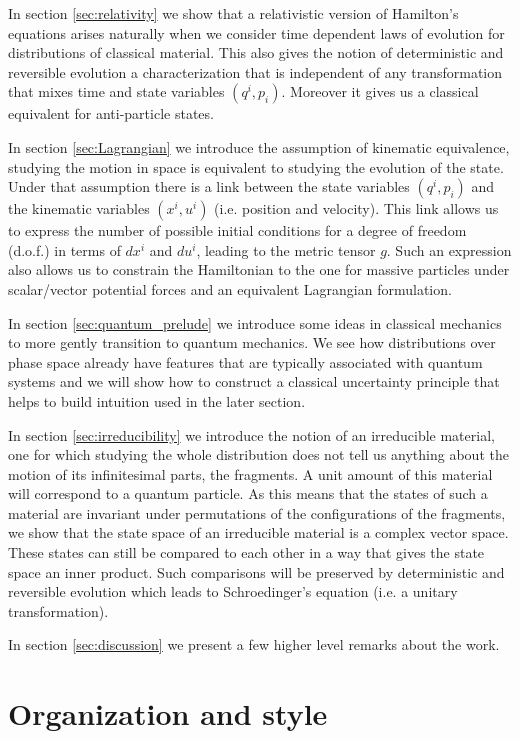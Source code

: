 \documentclass[smallextended]{svjour3}
\numberwithin{equation}{section}
\theoremstyle{definition}
\begin{document}
In section \ref{sec:relativity} we show that a relativistic version of Hamilton's equations arises naturally when we consider time dependent laws of evolution for distributions of classical material. This also gives the notion of deterministic and reversible evolution a characterization that is independent of any transformation that mixes time and state variables $(q^i, p_i)$. Moreover it gives us a classical equivalent for anti-particle states.

In section \ref{sec:Lagrangian} we introduce the assumption of kinematic equivalence, studying the motion in space is equivalent to studying the evolution of the state. Under that assumption there is a link between the state variables $(q^i, p_i)$ and the kinematic variables $(x^i, u^i)$ (i.e. position and velocity). This link allows us to express the number of possible initial conditions for a degree of freedom (d.o.f.) in terms of $dx^i$ and $du^i$, leading to the metric tensor $g$. Such an expression also allows us to constrain the Hamiltonian to the one for massive particles under scalar/vector potential forces and an equivalent Lagrangian formulation.

In section \ref{sec:quantum_prelude} we introduce some ideas in classical mechanics to more gently transition to quantum mechanics. We see how distributions over phase space already have features that are typically associated with quantum systems and we will show how to construct a classical uncertainty principle that helps to build intuition used in the later section.

In section \ref{sec:irreducibility} we introduce the notion of an irreducible material, one for which studying the whole distribution does not tell us anything about the motion of its infinitesimal parts, the fragments. A unit amount of this material will correspond to a quantum particle. As this means that the states of such a material are invariant under permutations of the configurations of the fragments, we show that the state space of an irreducible material is a complex vector space. These states can still be compared to each other in a way that gives the state space an inner product. Such comparisons will be preserved by deterministic and reversible evolution which leads to Schroedinger's equation (i.e. a unitary transformation).

In section \ref{sec:discussion} we present a few higher level remarks about the work.

\section{Organization and style}
\end{document}
